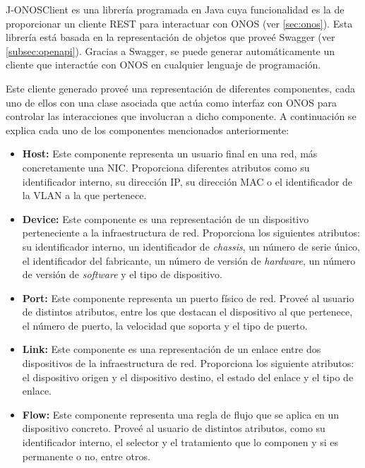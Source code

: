 J-ONOSClient\cite{onosjavadocbib} es una librería programada en Java cuya funcionalidad es la de proporcionar un cliente \ac{REST} para interactuar con \ac{ONOS} (ver \ref{sec:onos}). Esta librería está basada en la representación de objetos que proveé Swagger (ver \ref{subsec:openapi}). Gracias a Swagger, se puede generar automáticamente un cliente que interactúe con \ac{ONOS} en cualquier lenguaje de programación.

Este cliente generado proveé una representación de diferentes componentes, cada uno de ellos con una clase asociada que actúa como interfaz con \ac{ONOS} para controlar las interacciones que involucran a dicho componente. A continuación se explica cada uno de los componentes mencionados anteriormente:

\begin{itemize}
	
	\item \textbf{Host:} Este componente representa un usuario final en una red, más concretamente una \ac{NIC}. Proporciona diferentes atributos como su identificador interno, su dirección \ac{IP}, su dirección \ac{MAC} o el identificador de la \ac{VLAN} a la que pertenece.
	
	\item \textbf{Device:} Este componente es una representación de un dispositivo perteneciente a la infraestructura de red. Proporciona los siguientes atributos: su identificador interno, un identificador de \textit{chassis}, un número de serie único, el identificador del fabricante, un número de versión de \textit{hardware}, un número de versión de \textit{software} y el tipo de dispositivo. 
	
	\item \textbf{Port:} Este componente representa un puerto físico de red. Proveé al usuario de distintos atributos, entre los que destacan el dispositivo al que pertenece, el número de puerto, la velocidad que soporta y el tipo de puerto.
	
	\item \textbf{Link:} Este componente es una representación de un enlace entre dos dispositivos de la infraestructura de red. Proporciona los siguiente atributos: el dispositivo origen y el dispositivo destino, el estado del enlace y el tipo de enlace.
	
	\item \textbf{Flow:} Este componente representa una regla de flujo que se aplica en un dispositivo concreto. Proveé al usuario de distintos atributos, como su identificador interno, el selector y el tratamiento que lo componen y si es permanente o no, entre otros.
	

\end{itemize}

